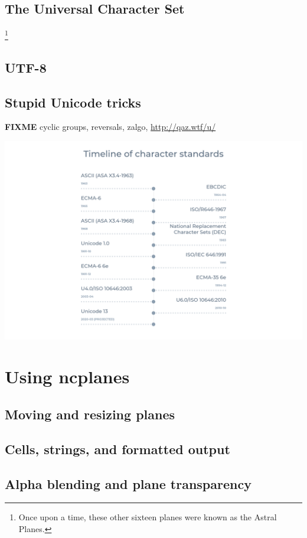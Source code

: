 \documentclass[letterpaper,10pt]{article}
\begin{document}
\subsection{The Universal Character Set}
\footnote{Once upon a time, these other sixteen planes were known as the
  Astral Planes\cite{astralplanes}.}
\subsection{UTF-8}
\subsection{Stupid Unicode tricks}
\textbf{FIXME} cyclic groups, reversals, zalgo, \url{http://qaz.wtf/u/}


\begin{center}
\includegraphics[width=.9\linewidth]{media/charset-timeline.png}
\end{center}


\newpage
\section{Using ncplanes}
\label{ncplane}
\subsection{Moving and resizing planes}
\subsection{Cells, strings, and formatted output}
\subsection{Alpha blending and plane transparency}
\end{document}
